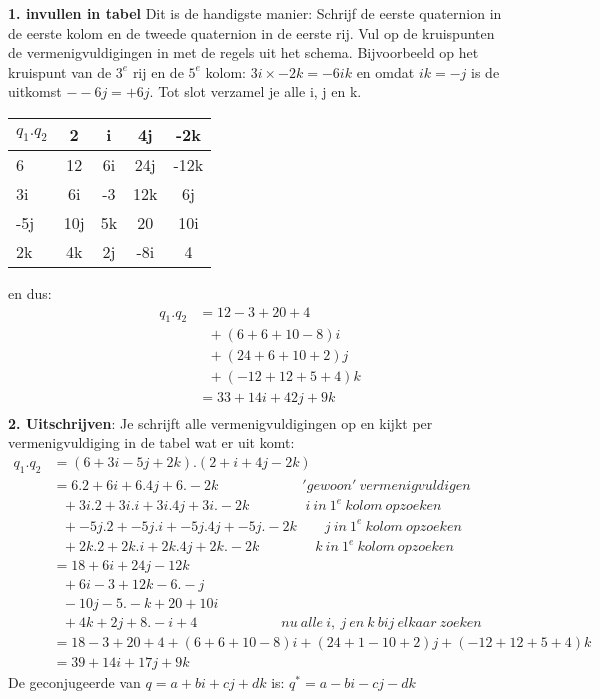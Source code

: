 \textbf{1. invullen in tabel} Dit is de handigste manier:  Schrijf de eerste quaternion in de eerste kolom en de tweede quaternion in de eerste rij. Vul op de kruispunten de 
vermenigvuldigingen in met de  regels uit het schema. Bijvoorbeeld op het kruispunt van de $ 3^e $ rij en de $   5^e $ kolom: $  3i\times -2k = -6ik   $ en omdat $ ik = -j $ is de uitkomst $ --6j = +6j $. Tot slot verzamel je  alle i, j en k.
\begin{center}
	\begin{tabular}{ | l || c | c |c |c |}
		\hline
		$ q_1.q_2 $& 2 & i & 4j & -2k \\ \hline \hline
		6 & 12 & 6i & 24j & -12k  \\ \hline
		3i & 6i & -3 & 12k & 6j\\ \hline
		-5j & 10j &  5k & 20 & 10i\\ \hline
		2k & 4k & 2j & -8i & 4\\ 
		\hline 
	\end{tabular}
\end{center}
en dus:
\begin{align*}
q_1.q_2 & = 12 - 3 + 20 + 4 \\
& \ \ \ +(6 + 6 + 10 - 8)i \\
& \ \ \ +(24 + 6 +10 +2)j \\
& \ \ \ +(-12 + 12 + 5 +4 )k \\
& = 33 +14i +42j +9k \\
\end{align*}
\textbf{2. Uitschrijven}: Je schrijft alle vermenigvuldigingen op en kijkt per vermenigvuldiging in de tabel wat er uit komt:
\begin{align*}
q_1.q_2 & = (6 + 3i - 5j + 2k) . (2 + i + 4j - 2k) \\
& =   6.2 + 6i + 6.4j + 6.-2k \qquad  \qquad \qquad  'gewoon' \  vermenigvuldigen\\
& \ \ \ + 3i.2 + 3i.i + 3i.4j + 3i.-2k \qquad \qquad  i\  in \ 1^e \  kolom  \ opzoeken\\
& \ \ \ + -5j.2 + -5j.i + -5j.4j + -5j.-2k \qquad j \  in \ 1^e \ kolom \ opzoeken\\
& \ \ \ + 2k.2 + 2k.i + 2k.4j + 2k.-2k \qquad \qquad k \  in \ 1^e \ kolom \ opzoeken\\
& = 18 + 6i + 24j - 12k \\
& \ \ \ + 6i - 3 + 12k -6.-j \\
& \ \ \ -10j - 5.-k + 20 +10i \\
& \ \ \  + 4k + 2j + 8.-i + 4 \qquad \qquad \qquad   nu \ alle \ i, \ j \ en \ k\ bij \ elkaar \  zoeken \\
& = 18 - 3 + 20 + 4 + (6+6 + 10 -8)i + (24 + 1 - 10 + 2)j + (-12 + 12 + 5 + 4)k \\
&  = 39 + 14i +17j +9k
\end{align*}
{De geconjugeerde van $ q = a +bi + cj + dk $  is: 
	\quad	$ q^* = a - bi - cj - dk $ }\\ \\
